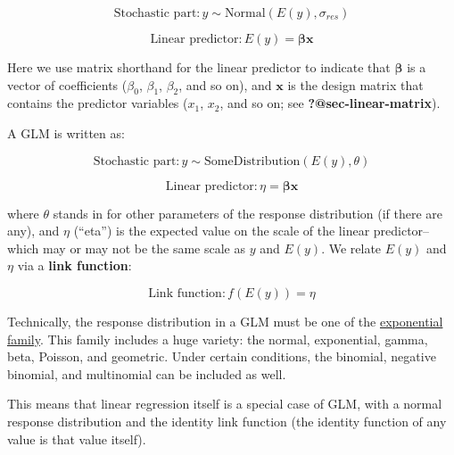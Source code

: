 \documentclass[
  13,
  letterpaper,
]{report}
\begin{document}
\[\text{Stochastic part}:y\sim \text{Normal}\left(E\left(y\right),\sigma_{res}\right)\]

\[\text{Linear predictor}:E\left(y\right)=\boldsymbol{\beta}\mathbf{x}\]

Here we use matrix shorthand for the linear predictor to indicate that
\(\boldsymbol{\beta}\) is a vector of coefficients (\(\beta_0\),
\(\beta_1\), \(\beta_2\), and so on), and \(\mathbf{x}\) is the design
matrix that contains the predictor variables (\(x_1\), \(x_2\), and so
on; see \textbf{?@sec-linear-matrix}).

A GLM is written as:

\[\text{Stochastic part}:y\sim \text{SomeDistribution}\left(E\left(y\right),\theta\right)\]

\[\text{Linear predictor}:\eta=\boldsymbol{\beta}\mathbf{x}\]

where \(\theta\) stands in for other parameters of the response
distribution (if there are any), and \(\eta\) (``eta'') is the expected
value on the scale of the linear predictor--which may or may not be the
same scale as \(y\) and \(E\left(y\right)\). We relate
\(E\left(y\right)\) and \(\eta\) via a \textbf{link function}:

\[\text{Link function}:f\left(E\left(y\right)\right)=\eta\]

\begin{tcolorbox}[enhanced jigsaw, arc=.35mm, bottomrule=.15mm, bottomtitle=1mm, breakable, colback=white, colbacktitle=quarto-callout-note-color!10!white, colframe=quarto-callout-note-color-frame, coltitle=black, left=2mm, leftrule=.75mm, opacityback=0, opacitybacktitle=0.6, rightrule=.15mm, title=\textcolor{quarto-callout-note-color}{\faInfo}\hspace{0.5em}{GLM response distributions}, titlerule=0mm, toprule=.15mm, toptitle=1mm]

Technically, the response distribution in a GLM must be one of the
\href{https://en.wikipedia.org/wiki/Exponential_family}{exponential
family}. This family includes a huge variety: the normal, exponential,
gamma, beta, Poisson, and geometric. Under certain conditions, the
binomial, negative binomial, and multinomial can be included as well.

\end{tcolorbox}

This means that linear regression itself is a special case of GLM, with
a normal response distribution and the identity link function (the
identity function of any value is that value itself).
\end{document}
